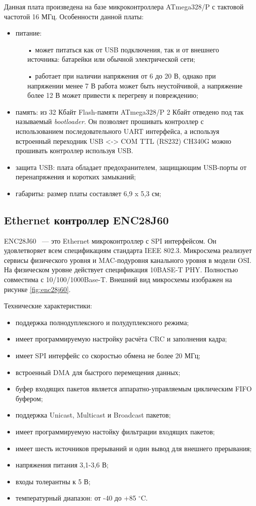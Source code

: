 Данная плата произведена на базе микроконтроллера ATmega328/P с тактовой частотой 16 МГц. Особенности данной платы\cite{arduino}:
\begin{itemize}
	\item питание:
	\begin{itemize}
		\item[•] может питаться как от USB подключения, так и от внешнего источника: батарейки или обычной электрической сети;
		\item[•] работает при наличии напряжения от 6 до 20 В, однако при напряжении менее 7 В работа может быть неустойчивой, а напряжение более 12 В может привести к перегреву и повреждению;
	\end{itemize}
	\item память: из 32 Кбайт Flash-памяти ATmega328/P 2 Кбайт отведено под так называемый \textit{bootloader}. Он позволяет прошивать контроллер с использованием последовательного UART интерфейса, а используя встроенный переходник USB <-> COM TTL (RS232) CH340G можно прошивать контроллер используя USB.
	\item защита USB: плата обладает предохранителем, защищающим USB-порты от перенапряжения и коротких замыканий;
	\item габариты: размер платы составляет 6,9 x 5,3 см;
\end{itemize}

\subsection{Ethernet контроллер ENC28J60}

ENC28J60 ~--- это Ethernet микроконтроллер с SPI интерфейсом. Он удовлетворяет всем спецификациям стандарта IEEE 802.3. Микросхема реализует сервисы физического уровня и MAC-подуровня канального уровня в модели OSI. На физическом уровне действует спецификация 10BASE-T PHY. Полностью совместима с 10/100/1000Base-T. Внешний вид микросхемы изображен на рисунке \ref{fig:enc28j60}.

Технические характеристики\cite{enc28j60datasheet}:
\begin{itemize}
	\item поддержка полнодуплексного и полудуплексного режима;
	\item имеет программируемую настройку расчёта CRC и заполнения кадра;
	\item имеет SPI интерфейс со скоростью обмена не более 20 МГц;
	\item встроенный DMA для быстрого перемещения данных;
	\item буфер входящих пакетов является аппаратно-управляемым циклическим FIFO буфером;
	\item поддержка Unicast, Multicast и Broadcast пакетов;
	\item имеет программируемую настойку фильтрации входящих пакетов;
	\item имеет шесть источников прерываний и один вывод для внешнего прерывания;
	\item напряжения питания 3,1-3,6 В;
	\item входы толерантны к 5 В;
	\item температурный диапазон:  от -40 до +85 $^{\circ}$C.
\end{itemize}

